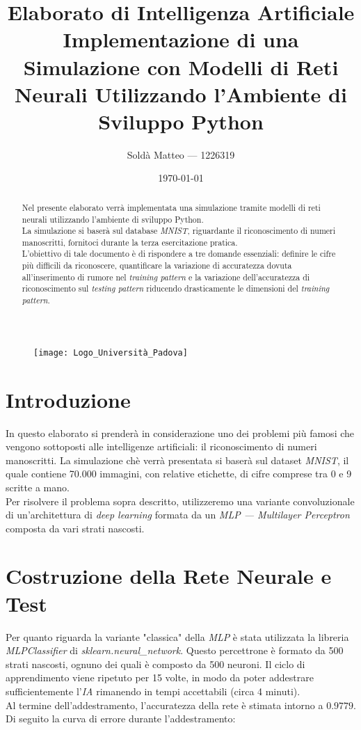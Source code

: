 \documentclass[12pt, a4paper]{article}
\title{\textbf{Elaborato di Intelligenza Artificiale} \\ Implementazione di una Simulazione con Modelli di Reti Neurali Utilizzando l'Ambiente di Sviluppo Python}
\author{Soldà Matteo --- 1226319}
\date{\today}
\begin{document}
\begin{figure}
    \centering
    \texttt{[image: Logo\_Università\_Padova]}
\end{figure}

\maketitle

\newpage
\begin{abstract}
Nel presente elaborato verrà implementata una simulazione tramite modelli di reti neurali utilizzando l'ambiente di sviluppo Python.\\
La simulazione si baserà sul database \textit{MNIST}, riguardante il riconoscimento di numeri manoscritti, fornitoci durante la terza esercitazione pratica.\\
L'obiettivo di tale documento è di rispondere a tre domande essenziali: definire le cifre più difficili da riconoscere, quantificare la variazione di accuratezza dovuta all'inserimento di rumore nel \textit{training pattern} e la variazione dell'accuratezza di riconoscimento sul \textit{testing pattern} riducendo drasticamente le dimensioni del \textit{training pattern}.    
\end{abstract}

\newpage
\tableofcontents

\newpage
\section{Introduzione}
In questo elaborato si prenderà in considerazione uno dei problemi più famosi che vengono sottoposti alle intelligenze artificiali: il riconoscimento di numeri manoscritti.
La simulazione chè verrà presentata si baserà sul dataset \textit{MNIST}, il quale contiene 70.000 immagini, con relative etichette, di cifre comprese tra 0 e 9 scritte a mano.\\
Per risolvere il problema sopra descritto, utilizzeremo una variante convoluzionale di un'architettura di \textit{deep learning} formata da un \textit{MLP --- Multilayer Perceptron} composta da vari strati nascosti.

\newpage
\section{Costruzione della Rete Neurale e Test}
Per quanto riguarda la variante "classica" della \textit{MLP} è stata utilizzata la libreria \textit{MLPClassifier} di \textit{sklearn.neural\_network}. Questo percettrone è formato da 500 strati nascosti, ognuno dei quali è composto da 500 neuroni. Il ciclo di apprendimento viene ripetuto per 15 volte, in modo da poter addestrare sufficientemente l'\textit{IA} rimanendo in tempi accettabili (circa 4 minuti).\\
Al termine dell'addestramento, l'accuratezza della rete è stimata intorno a \(0.9779\). Di seguito la curva di errore durante l'addestramento:
\end{document}
